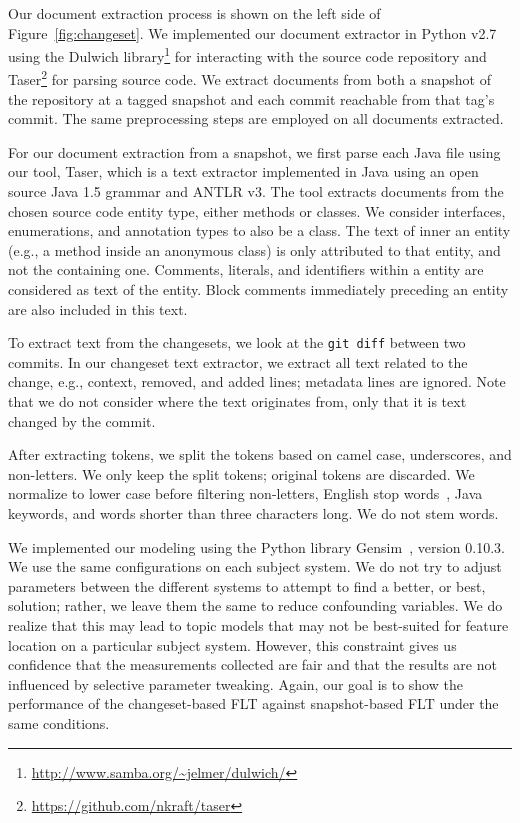 Our document extraction process is shown on the left side of Figure~\ref{fig:changeset}.
We implemented our document extractor in Python v2.7
using the Dulwich library\footnote{\url{http://www.samba.org/~jelmer/dulwich/}}
for interacting with the source code repository and
Taser\footnote{\url{https://github.com/nkraft/taser}} for parsing source code.
We extract documents from both a snapshot of the repository at a tagged
snapshot and each commit reachable from that tag's commit.
The same preprocessing steps are employed on all documents extracted.

For our document extraction from a snapshot, we first parse each Java file using our tool, Taser, which
is a text extractor implemented in Java using an open source Java 1.5 grammar and ANTLR v3.
The tool extracts documents from the chosen source code entity type, either methods or classes.
We consider interfaces, enumerations, and annotation types to also be a class.
The text of inner an entity (e.g., a method inside an anonymous class)
is only attributed to that entity, and not the containing one.
Comments, literals, and identifiers within a entity are considered as text of the entity.
Block comments immediately preceding an entity are also included in this text.

To extract text from the changesets, we look at
the \texttt{git diff} between two commits.
In our changeset text extractor, we extract all text related to the
change, e.g., context, removed, and added lines; metadata lines are ignored.
Note that we do not consider where the text originates from,
only that it is text changed by the commit.%

After extracting tokens, we split the tokens based on camel case,
underscores, and non-letters.
We only keep the split tokens; original tokens are discarded.
We normalize to lower case before filtering non-letters, English stop words~\cite{StopWords}, Java keywords, and words shorter than three characters long.
We do not stem words.

We implemented our modeling using the Python library Gensim~\cite{Gensim},
version 0.10.3. We use the same configurations on each subject system.  We do
not try to adjust parameters between the different systems to attempt to find
a better, or best, solution; rather, we leave them the same to reduce
confounding variables.  We do realize that this may lead to topic models that
may not be best-suited for feature location on a particular subject system.
However, this constraint gives us confidence that the measurements collected are
fair and that the results are not influenced by selective parameter tweaking.
Again, our goal is to show the performance of the changeset-based FLT against
snapshot-based FLT under the same conditions.

